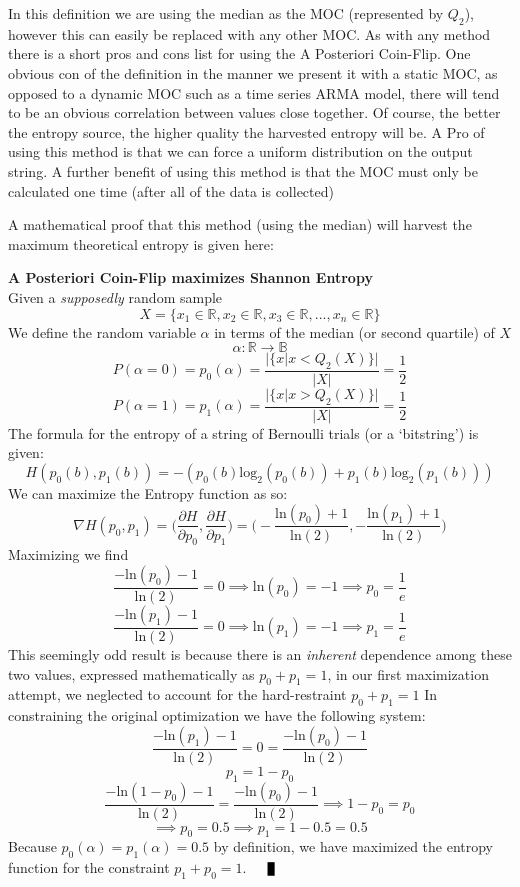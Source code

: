 \documentclass{IEEEtran}
\newenvironment{proof}[1][Proof]{\begin{trivlist}
\item[\hskip \labelsep {\bfseries #1}]}{\end{trivlist}}
\newcommand{\qed}{\nobreak \ifvmode \relax \else
      \ifdim\lastskip<1.5em \hskip-\lastskip
      \hskip1.5em plus0em minus0.5em \fi \nobreak
      \vrule height0.75em width0.5em depth0.25em\fi}
\begin{document}
In this definition we are using the median as the MOC (represented by $Q_2$), however this can easily be replaced with any other MOC. As with any method there is a short pros and cons list for using the A Posteriori Coin-Flip. One obvious con of the definition in the manner we present it with a static MOC, as opposed to a dynamic MOC such as a time series ARMA model, there will tend to be an obvious correlation between values close together. Of course, the better the entropy source, the higher quality the harvested entropy will be. A Pro of using this method is that we can force a uniform distribution on the output string. A further benefit of using this method is that the MOC must only be calculated one time (after all of the data is collected) 

A mathematical proof that this method (using the median) will harvest the maximum theoretical entropy is given here: 

\begin{proof} \textbf{A Posteriori Coin-Flip maximizes Shannon Entropy} \\
Given a \textit{supposedly} random sample $$X = \{x_1 \in \mathbb{R},x_2\in \mathbb{R},x_3\in \mathbb{R},...,x_n\in \mathbb{R}\}$$We define the random variable $\alpha$ in terms of the median (or second quartile) of $X$ $$\alpha:\mathbb{R}\to\mathbb{B}$$ $$P(\alpha =  0) = p_0(\alpha) = \frac{\vert\{x\vert x<Q_2(X)\}\vert}{\vert X \vert} = \frac{1}{2} $$ $$P(\alpha =  1) = p_1(\alpha) = \frac{\vert\{x\vert x>Q_2(X)\}\vert}{\vert X \vert} = \frac{1}{2}$$The formula for the entropy of a string of Bernoulli trials (or a `bitstring') is given:$$H(p_0(b),p_1(b)) = -(p_0(b)\textrm{log}_2(p_0(b)) +p_1(b)\textrm{log}_2(p_1(b)))$$ We can maximize the Entropy function as so:$$\nabla H(p_0,p_1) = \Big(\frac{\partial H}{\partial p_0},\frac{\partial H}{\partial p_1}\Big) = \Big(-\frac{\textrm{ln}(p_0) + 1}{\textrm{ln}(2)},-\frac{\textrm{ln}(p_1) + 1}{\textrm{ln}(2)}\Big)$$Maximizing we find$$\frac{-\textrm{ln}(p_0) - 1}{\textrm{ln}(2)} = 0 \implies \textrm{ln}(p_0) = -1 \implies p_0 = \frac{1}{e}$$ $$\frac{-\textrm{ln}(p_1) - 1}{\textrm{ln}(2)} = 0 \implies \textrm{ln}(p_1) = -1 \implies p_1 = \frac{1}{e}$$This seemingly odd result is because there is an \textit{inherent} dependence among these two values, expressed mathematically as $p_0 + p_1 = 1$, in our first maximization attempt, we neglected to account for the hard-restraint $p_0 +p_1 = 1$ In constraining the original optimization we have the following system: 
$$\frac{-\textrm{ln}(p_1) - 1}{\textrm{ln}(2)} = 0 = \frac{-\textrm{ln}(p_0) - 1}{\textrm{ln}(2)}$$
$$ p_1 = 1-p_0$$
$$ \frac{-\textrm{ln}(1-p_0) - 1}{\textrm{ln}(2)} = \frac{-\textrm{ln}(p_0) - 1}{\textrm{ln}(2)} \implies 1-p_0 = p_0$$$$ \implies p_0 = 0.5 \implies p_1 = 1 - 0.5 = 0.5$$Because $p_0(\alpha) = p_1(\alpha) = 0.5$ by definition, we have maximized the entropy function for the constraint $p_1 + p_0 = 1$.\hfill  $\qed$
\end{proof}
\end{document}
